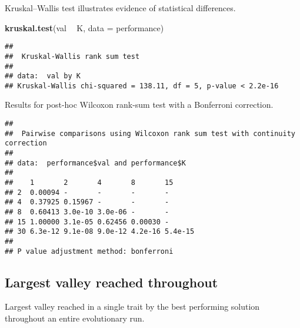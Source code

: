 \documentclass[]{book}
\newenvironment{Shaded}{\begin{snugshade}}{\end{snugshade}}
\newcommand{\DataTypeTok}[1]{\textcolor[rgb]{0.13,0.29,0.53}{#1}}
\newcommand{\KeywordTok}[1]{\textcolor[rgb]{0.13,0.29,0.53}{\textbf{#1}}}
\newcommand{\NormalTok}[1]{#1}
\newcommand{\OperatorTok}[1]{\textcolor[rgb]{0.81,0.36,0.00}{\textbf{#1}}}
\newcommand{\OtherTok}[1]{\textcolor[rgb]{0.56,0.35,0.01}{#1}}
\newcommand{\StringTok}[1]{\textcolor[rgb]{0.31,0.60,0.02}{#1}}
\begin{document}
Kruskal--Wallis test illustrates evidence of statistical differences.

\begin{Shaded}
\begin{Highlighting}[]
\KeywordTok{kruskal.test}\NormalTok{(val }\OperatorTok{~}\StringTok{ }\NormalTok{K, }\DataTypeTok{data =}\NormalTok{ performance)}
\end{Highlighting}
\end{Shaded}

\begin{verbatim}
## 
##  Kruskal-Wallis rank sum test
## 
## data:  val by K
## Kruskal-Wallis chi-squared = 138.11, df = 5, p-value < 2.2e-16
\end{verbatim}

Results for post-hoc Wilcoxon rank-sum test with a Bonferroni correction.

\begin{Shaded}
\end{Shaded}

\begin{verbatim}
## 
##  Pairwise comparisons using Wilcoxon rank sum test with continuity correction 
## 
## data:  performance$val and performance$K 
## 
##    1       2       4       8       15     
## 2  0.00094 -       -       -       -      
## 4  0.37925 0.15967 -       -       -      
## 8  0.60413 3.0e-10 3.0e-06 -       -      
## 15 1.00000 3.1e-05 0.62456 0.00030 -      
## 30 6.3e-12 9.1e-08 9.0e-12 4.2e-16 5.4e-15
## 
## P value adjustment method: bonferroni
\end{verbatim}

\hypertarget{largest-valley-reached-throughout-23}{%
\subsection{Largest valley reached throughout}\label{largest-valley-reached-throughout-23}}

Largest valley reached in a single trait by the best performing solution throughout an entire evolutionary run.
\end{document}
